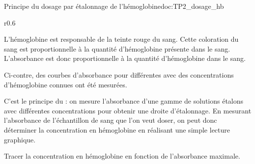 \begin{doc}{Principe du dosage par étalonnage de l'hémoglobine}{doc:TP2_dosage_hb}
  \begin{wrapfigure}[10]{r}{0.6\linewidth}
    \centering
    \vspace*{-18pt}
  \end{wrapfigure}
  
  L'hémoglobine est responsable de la teinte rouge du sang.
  Cette coloration du sang est proportionnelle à la quantité d'hémoglobine présente dans le sang.
  L'absorbance est donc proportionnelle à la quantité d'hémoglobine dans le sang.
  
  Ci-contre, des courbes d'absorbance pour différentes  avec des concentrations d'hémoglobine connues ont été mesurées.
  
  C'est le principe du  : on mesure l'absorbance d'une gamme de solutions étalons avec différentes concentrations pour obtenir une droite d'étalonnage.
  En  mesurant l'absorbance de l'échantillon de sang que l'on veut doser, on peut donc déterminer la concentration en hémoglobine en réalisant une simple lecture graphique.
\end{doc}


\mesure Tracer la concentration en hémoglobine en fonction de l'absorbance maximale.



